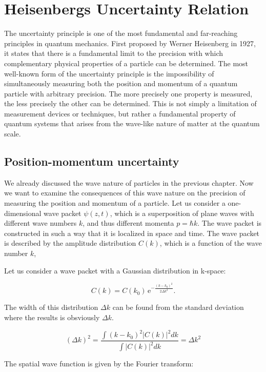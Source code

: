 \documentclass[
  a4paper,
]{book}
\begin{document}
\chapter{Heisenbergs Uncertainty
Relation}\label{heisenbergs-uncertainty-relation}

The uncertainty principle is one of the most fundamental and
far-reaching principles in quantum mechanics. First proposed by Werner
Heisenberg in 1927, it states that there is a fundamental limit to the
precision with which complementary physical properties of a particle can
be determined. The most well-known form of the uncertainty principle is
the impossibility of simultaneously measuring both the position and
momentum of a quantum particle with arbitrary precision. The more
precisely one property is measured, the less precisely the other can be
determined. This is not simply a limitation of measurement devices or
techniques, but rather a fundamental property of quantum systems that
arises from the wave-like nature of matter at the quantum scale.

\section{Position-momentum
uncertainty}\label{position-momentum-uncertainty}

We already discussed the wave nature of particles in the previous
chapter. Now we want to examine the consequences of this wave nature on
the precision of measuring the position and momentum of a particle. Let
us consider a one-dimensional wave packet \(\psi \left( z,t \right)\),
which is a superposition of plane waves with different wave numbers
\(k\), and thus different momenta \(p = \hbar k\). The wave packet is
constructed in such a way that it is localized in space and time. The
wave packet is described by the amplitude distribution
\(C \left( k \right)\), which is a function of the wave number \(k\),

Let us consider a wave packet with a Gaussian distribution in k-space:

\[
C \left( k \right) = C \left( k_0 \right) \, \mathrm{e}^{- \frac{\left( k-k_0\right)^2}{2 \Delta k^2}} \mathrm{.}
\]

The width of this distribution \(\Delta k\) can be found from the
standard deviation where the results is obsviously \(\Delta k\).

\[
(\Delta k)^2 = \frac{\int (k-k_0)^2 |C(k)|^2 dk}{\int |C(k)|^2 dk} = \Delta k^2
\]

The spatial wave function is given by the Fourier transform:
\end{document}
